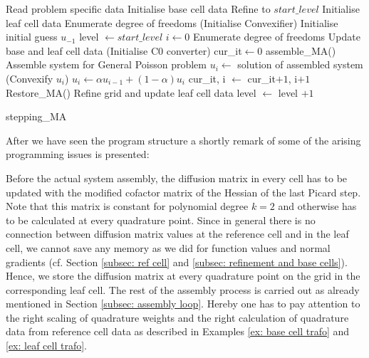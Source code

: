 \begin{algorithm}[H]
\begin{algorithmic}
	\State Read problem specific data
	\State Initialise base cell data
	\State Refine to $start\_level$
	\State Initialise leaf cell data
	\State Enumerate degree of freedoms
	\State (Initialise Convexifier)
	\State Initialise initial guess $u_{-1}$
	\State level $\gets start\_level$
	\State $i \gets 0$
		\State Enumerate degree of freedoms
		\State Update base and leaf cell data
		\State (Initialise C0 converter) 
		\State cur\_it$ \gets 0$
			\State  assemble\_MA()                              \Comment Assemble system for General Poisson problem
			\State $u_i \gets$ solution of assembled system
			\State (Convexify $u_i$)		 
			\State $u_i \gets \alpha u_{i-1}  +(1-\alpha) u_i$
			\State	cur\_it, i $\gets$ cur\_it$+1$, i$+1$
			\State Restore\_MA() 		
		\EndWhile
		\State Refine grid and update leaf cell data
		\State level $\gets$ level $+1$
	\EndWhile
\end{algorithmic}
\caption{stepping\_MA}
\label{alg: stepping}
\end{algorithm}

After we have seen the program structure a shortly remark of some of the arising programming issues is presented:

Before the actual system assembly, the diffusion matrix in every cell has to be updated with the modified cofactor matrix of the Hessian of the last Picard step. Note that this matrix is constant for polynomial degree $k=2$ and otherwise has to be calculated at every quadrature point. Since in general there is no connection between diffusion matrix values at the reference cell and in the leaf cell, we cannot save any memory as we did for function values and normal gradients (cf. Section \ref{subsec: ref cell} and \ref{subsec: refinement and base cells}). Hence, we store the diffusion matrix at every quadrature point on the grid in the corresponding leaf cell.
The rest of the assembly process is carried out as already mentioned in Section \ref{subsec: assembly loop}. Hereby one has to pay attention to the right scaling of quadrature weights and the right calculation of quadrature data from reference cell data as described in Examples \ref{ex: base cell trafo} and \ref{ex: leaf cell trafo}. 

